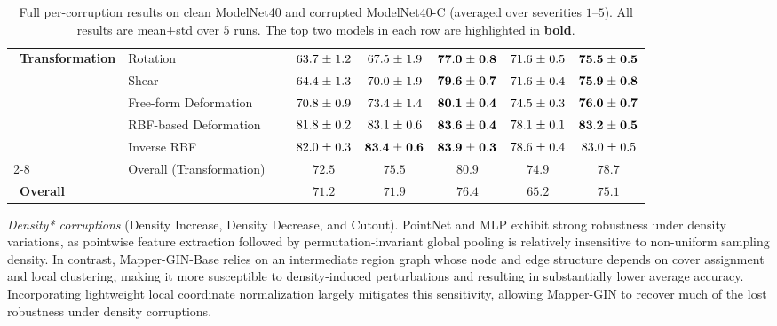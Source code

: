 \documentclass{article}
\begin{document}
\begin{table}[t]
\begin{tabular}{l l|c c c c c c}
\multirow{5}{*}{\, \textbf{Transformation}}
& Rotation
&& $63.7\mkern1mu\pm\mkern1mu1.2$
& $67.5\mkern1mu\pm\mkern1mu1.9$
& $\mathbf{77.0\mkern1mu\pm\mkern1mu0.8}$
& $71.6\mkern1mu\pm\mkern1mu0.5$
& $\mathbf{75.5\mkern1mu\pm\mkern1mu0.5}$ \\
& Shear
&& $64.4\mkern1mu\pm\mkern1mu1.3$
& $70.0\mkern1mu\pm\mkern1mu1.9$
& $\mathbf{79.6\mkern1mu\pm\mkern1mu0.7}$
& $71.6\mkern1mu\pm\mkern1mu0.4$
& $\mathbf{75.9\mkern1mu\pm\mkern1mu0.8}$ \\
& Free-form Deformation
&& $70.8\mkern1mu\pm\mkern1mu0.9$
& $73.4\mkern1mu\pm\mkern1mu1.4$
& $\mathbf{80.1\mkern1mu\pm\mkern1mu0.4}$
& $74.5\mkern1mu\pm\mkern1mu0.3$
& $\mathbf{76.0\mkern1mu\pm\mkern1mu0.7}$ \\
& RBF-based Deformation
&& $81.8\mkern1mu\pm\mkern1mu0.2$
& $83.1\mkern1mu\pm\mkern1mu0.6$
& $\mathbf{83.6\mkern1mu\pm\mkern1mu0.4}$
& $78.1\mkern1mu\pm\mkern1mu0.1$
& $\mathbf{83.2\mkern1mu\pm\mkern1mu0.5}$ \\
& Inverse RBF
&& $82.0\mkern1mu\pm\mkern1mu0.3$
& $\mathbf{83.4\mkern1mu\pm\mkern1mu0.6}$
& $\mathbf{83.9\mkern1mu\pm\mkern1mu0.3}$
& $78.6\mkern1mu\pm\mkern1mu0.4$
& $83.0\mkern1mu\pm\mkern1mu0.5$ \\
\cline{2-8}
& Overall (Transformation) \,
&& $72.5$
& $75.5$
& $\mathbf{80.9}$
& $74.9$
& $\mathbf{78.7}$ \\
\midrule

\multicolumn{2}{l|}{\, \textbf{Overall}}
&& $71.2$ & $71.9$ & $\mathbf{76.4}$ & $65.2$ & $\mathbf{75.1}$ \\
\bottomrule
\end{tabular}
\vspace{5mm}
\caption{\small Full per-corruption results on clean ModelNet40 and corrupted ModelNet40-C (averaged over severities $1$--$5$).
All results are mean$\pm$std over $5$ runs.
The top two models in each row are highlighted in \textbf{bold}.}
\label{tab2}
\vspace{-6mm}
\end{table}

\emph{Density* corruptions} (Density Increase, Density Decrease, and Cutout).
PointNet and MLP exhibit strong robustness under density variations, as pointwise feature extraction followed by permutation-invariant global pooling is relatively insensitive to non-uniform sampling density. In contrast, Mapper-GIN-Base relies on an intermediate region graph whose node and edge structure depends on cover assignment and local clustering, making it more susceptible to density-induced perturbations and resulting in substantially lower average accuracy. Incorporating lightweight local coordinate normalization largely mitigates this sensitivity, allowing Mapper-GIN to recover much of the lost robustness under density corruptions.
\vspace{3mm}
\end{document}
